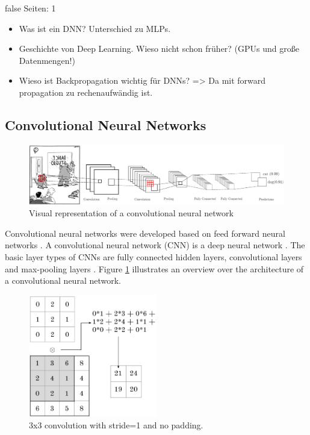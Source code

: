 \documentclass[draft,final,oneside]{vutinfth} %
\begin{document}
\if false
Seiten: 1
\begin{itemize}
\item Was ist ein DNN? Unterschied zu MLPs.
\item Geschichte von Deep Learning. Wieso nicht schon früher? (GPUs und große Datenmengen!)
\item Wieso ist Backpropagation wichtig für DNNs? => Da mit forward propagation zu rechenaufwändig ist.
\end{itemize}
\fi

\subsection{Convolutional Neural Networks} \label{mlcnn}

\begin{figure}[ht]
	\centering
  	\includegraphics[width=1.0\textwidth]{graphics/cnn.png}
	\caption{Visual representation of a convolutional neural network}
	\label{fig:cnn}
\end{figure}

Convolutional neural networks were developed based on feed forward neural networks \cite{bishop}. A convolutional neural network (CNN) is a deep neural network \cite{alexnet}. The basic layer types of CNNs are fully connected hidden layers, convolutional layers and max-pooling layers \cite{Goodfellow-et-al-2016}. Figure \ref{fig:cnn} illustrates an overview over the architecture of a convolutional neural network.

\begin{figure}[ht]
	\centering
  	\includegraphics[width=0.5\textwidth]{graphics/convolution.png}
	\caption{3x3 convolution with stride=1 and no padding.}
	\label{fig:convolution}
\end{figure}
\end{document}
